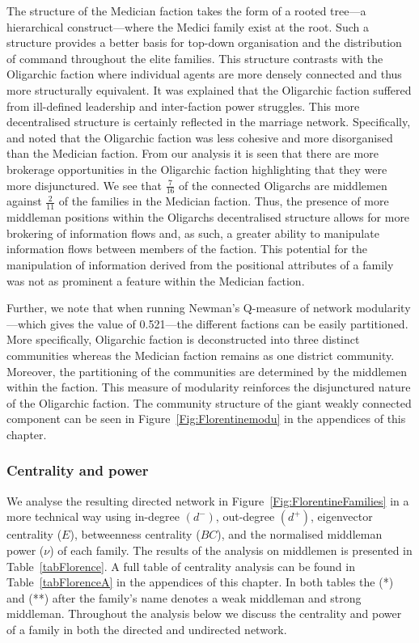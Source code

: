 The structure of the Medician faction takes the form of a rooted tree---a hierarchical construct---where the Medici family exist at the root. Such a structure provides a better basis for top-down organisation and the distribution of command throughout the elite families. This structure contrasts with the Oligarchic faction where individual agents are more densely connected and thus more structurally equivalent. It was explained that the Oligarchic faction suffered from ill-defined leadership and inter-faction power struggles. This more decentralised structure is certainly reflected in the marriage network. Specifically, \citet{Padgett1993} and \citet{PadgettMcLean2006} noted that the Oligarchic faction was less cohesive and more disorganised than the Medician faction. From our analysis it is seen that there are more brokerage opportunities in the Oligarchic faction highlighting that they were more disjunctured. We see that $\tfrac{7}{16}$ of the connected Oligarchs are middlemen against $\tfrac{2}{11}$ of the families in the Medician faction. Thus, the presence of more middleman positions within the Oligarchs decentralised structure allows for more brokering of information flows and, as such, a greater ability to manipulate information flows between members of the faction. This potential for the manipulation of information derived from the positional attributes of a family was not as prominent a feature within the Medician faction.

Further, we note that when running Newman's Q-measure of network modularity \citep{Newman2004detecting, Newman2006}---which gives the value of 0.521---the different factions can be easily partitioned. More specifically, Oligarchic faction is deconstructed into three distinct communities whereas the Medician faction remains as one district community. Moreover, the partitioning of the communities are determined by the middlemen within the faction. This measure of modularity reinforces the disjunctured nature of the Oligarchic faction. The community structure of the giant weakly connected component can be seen in Figure~\ref{Fig:Florentinemodu} in the appendices of this chapter.

\subsubsection{Centrality and power}

We analyse the resulting directed network in Figure~\ref{Fig:FlorentineFamilies} in a more technical way using in-degree $\left(d^-\right)$, out-degree $\left(d^+\right)$, \citet{Bonacich1987} eigenvector centrality ($E$), betweenness centrality ($BC$), and the normalised middleman power ($\nu$) of each family. The results of the analysis on middlemen is presented in Table~\ref{tabFlorence}. A full table of centrality analysis can be found in Table~\ref{tabFlorenceA} in the appendices of this chapter. In both tables the (*) and (**) after the family's name denotes a weak middleman and strong middleman. Throughout the analysis below we discuss the centrality and power of a family in both the directed and undirected network.

